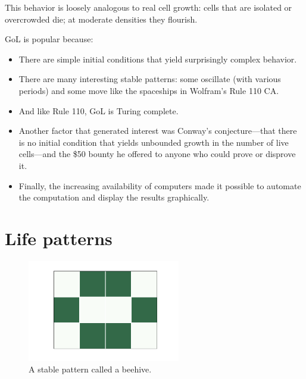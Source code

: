\documentclass[12pt]{book}
\theoremstyle{exercise}
\begin{document}
This behavior is loosely analogous to real cell growth: cells
that are isolated or overcrowded die; at moderate densities they
flourish.

GoL is popular because:

\begin{itemize}

\item There are simple initial conditions that yield
surprisingly complex behavior.


\item There are many interesting stable patterns: some
oscillate (with various periods) and some move like the
spaceships in Wolfram's Rule 110 CA.

\item And like Rule 110, GoL is Turing complete.


\item Another factor that generated interest was Conway's
conjecture---that there is
no initial condition that yields unbounded growth in the number
of live cells---and the \$50 bounty he offered to anyone who could prove
or disprove it.


\item Finally, the increasing availability of computers made it
  possible to automate the computation and display the results
  graphically.

\end{itemize}



\section{Life patterns}
\label{lifepatterns}

\begin{figure}
\centerline{\includegraphics[height=1.75in]{figs/chap06-1.pdf}}
\caption{A stable pattern called a beehive.}
\label{chap06-1}
\end{figure}
\end{document}
